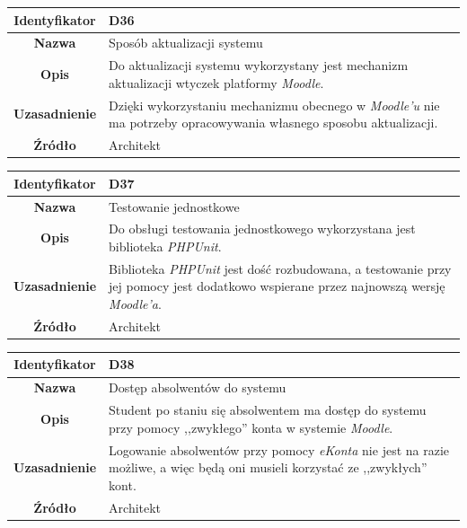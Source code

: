 \begin{table}[H]
\centering
\begin{tabular}{ | >{\bfseries}c | p{11cm} | }
\hline
%
Identyfikator & D36 \\ \hline
Nazwa & Sposób aktualizacji systemu \\ \hline
Opis & Do aktualizacji systemu wykorzystany jest mechanizm aktualizacji wtyczek platformy \textit{Moodle}. \\ \hline
Uzasadnienie & Dzięki wykorzystaniu mechanizmu obecnego w \textit{Moodle'u} nie ma potrzeby opracowywania własnego sposobu aktualizacji. \\ \hline
Źródło & Architekt \\ \hline
%
\end{tabular}
\end{table}

\begin{table}[H]
\centering
\begin{tabular}{ | >{\bfseries}c | p{11cm} | }
\hline
%
Identyfikator & D37 \\ \hline
Nazwa & Testowanie jednostkowe \\ \hline
Opis & Do obsługi testowania jednostkowego wykorzystana jest biblioteka \textit{PHPUnit}.  \\ \hline
Uzasadnienie & Biblioteka \textit{PHPUnit} jest dość rozbudowana, a testowanie przy jej pomocy jest dodatkowo wspierane przez najnowszą wersję \textit{Moodle'a}. \\ \hline
Źródło & Architekt \\ \hline
%
\end{tabular}
\end{table}

\begin{table}[H]
\centering
\begin{tabular}{ | >{\bfseries}c | p{11cm} | }
\hline
%
Identyfikator & D38 \\ \hline
Nazwa & Dostęp absolwentów do systemu \\ \hline
Opis & Student po staniu się absolwentem ma dostęp do systemu przy pomocy ,,zwykłego'' konta w systemie \textit{Moodle}. \\ \hline
Uzasadnienie & Logowanie absolwentów przy pomocy \textit{eKonta} nie jest na razie możliwe, a więc będą oni musieli korzystać ze ,,zwykłych'' kont. \\ \hline
Źródło & Architekt \\ \hline
%
\end{tabular}
\end{table}

